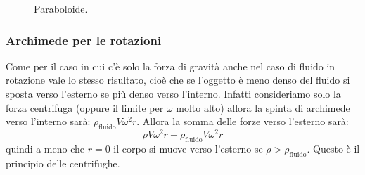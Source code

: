\begin{Es}
\begin{figure}[htbp]
      \caption{Paraboloide.}
   \end{figure}
   \subsubsection{Archimede per le rotazioni}
   Come per il caso in cui c'è solo la forza di gravità anche nel caso di fluido in rotazione vale lo stesso risultato, cioè che se l'oggetto è meno denso del fluido si sposta verso l'esterno se più denso verso l'interno. Infatti consideriamo solo la forza centrifuga (oppure il limite per $\omega$ molto alto) allora la spinta di archimede verso l'interno sarà: $\rho_\text{fluido}V\omega^2 r$. Allora la somma delle forze verso l'esterno sarà:
   \[
      \rho V\omega^2 r-\rho_\text{fluido}V\omega^2 r
   \]
   quindi a meno che $r=0$ il corpo si muove verso l'esterno se $\rho>\rho_\text{fluido}$. Questo è il principio delle centrifughe.
\end{Es}

